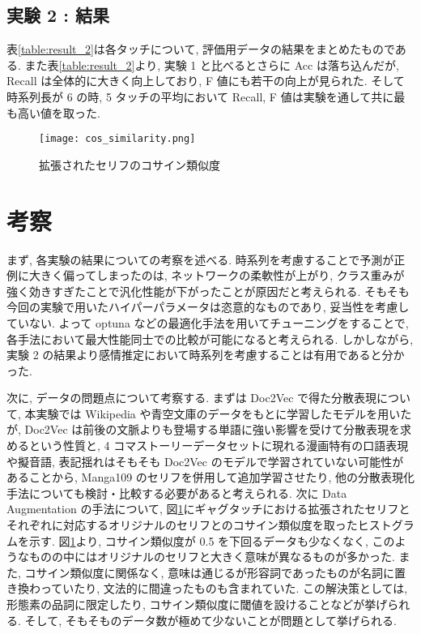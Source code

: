 \documentclass[twocolumn]{jarticle}     %
\begin{document}
\subsection{実験 2 : 結果}
表\ref{table:result_2}は各タッチについて, 評価用データの結果をまとめたものである.
また表\ref{table:result_2}より, 実験 1 と比べるとさらに Acc は落ち込んだが, Recall は全体的に大きく向上しており, F 値にも若干の向上が見られた.
そして時系列長が 6 の時, 5 タッチの平均において Recall, F 値は実験を通して共に最も高い値を取った.


\begin{figure}[tb]
  \centering
  \texttt{[image: cos\_similarity.png]}
  \caption{拡張されたセリフのコサイン類似度}
  \label{fig:cos}
\end{figure}

\section{考察}
まず, 各実験の結果についての考察を述べる.
時系列を考慮することで予測が正例に大きく偏ってしまったのは, ネットワークの柔軟性が上がり, クラス重みが強く効きすぎたことで汎化性能が下がったことが原因だと考えられる. そもそも今回の実験で用いたハイパーパラメータは恣意的なものであり, 妥当性を考慮していない. よって optuna などの最適化手法を用いてチューニングをすることで, 各手法において最大性能同士での比較が可能になると考えられる. しかしながら, 実験 2 の結果より感情推定において時系列を考慮することは有用であると分かった.

次に, データの問題点について考察する. まずは Doc2Vec で得た分散表現について, 本実験では Wikipedia や青空文庫のデータをもとに学習したモデルを用いたが, Doc2Vec は前後の文脈よりも登場する単語に強い影響を受けて分散表現を求めるという性質と, 4 コマストーリーデータセットに現れる漫画特有の口語表現や擬音語, 表記揺れはそもそも Doc2Vec のモデルで学習されていない可能性があることから, Manga109 のセリフを併用して追加学習させたり, 他の分散表現化手法についても検討・比較する必要があると考えられる. 次に Data Augmentation の手法について, 図\ref{fig:cos}にギャグタッチにおける拡張されたセリフとそれぞれに対応するオリジナルのセリフとのコサイン類似度を取ったヒストグラムを示す. 図\ref{fig:cos}より, コサイン類似度が 0.5 を下回るデータも少なくなく, このようなものの中にはオリジナルのセリフと大きく意味が異なるものが多かった. また, コサイン類似度に関係なく, 意味は通じるが形容詞であったものが名詞に置き換わっていたり, 文法的に間違ったものも含まれていた. この解決策としては, 形態素の品詞に限定したり, コサイン類似度に閾値を設けることなどが挙げられる. そして, そもそものデータ数が極めて少ないことが問題として挙げられる.
\end{document}
